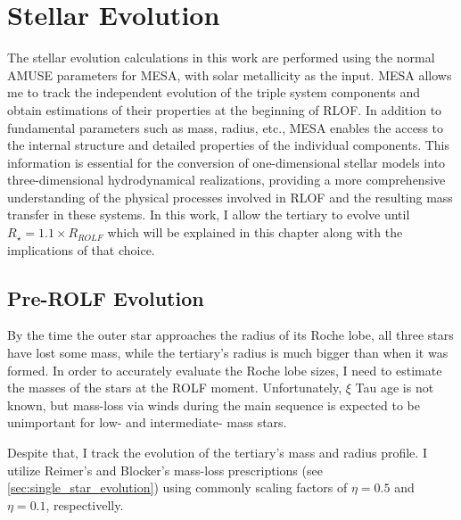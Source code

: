 \section{Stellar Evolution}\label{sec:stellar_evolution}

The stellar evolution calculations in this work are performed using the normal AMUSE parameters for MESA, with solar metallicity as the input.
MESA allows me to track the independent evolution of the triple system components and obtain estimations of their properties at the beginning of RLOF. In addition to fundamental parameters such as mass, radius, etc., MESA enables the access to the internal structure and detailed properties of the individual components. This information is essential for the conversion of one-dimensional stellar models into three-dimensional hydrodynamical realizations, providing a more comprehensive understanding of the physical processes involved in RLOF and the resulting mass transfer in these systems. In this work, I allow the tertiary to evolve until $R_{\star} = 1.1 \times R_{ROLF}$ which will be explained in this chapter along with the implications of that choice.

\subsection{Pre-ROLF Evolution}

By the time the outer star approaches the radius of its Roche lobe, all three stars have lost some mass, while the tertiary's radius is much bigger than when it was formed. In order to accurately evaluate the Roche lobe sizes,  I need to estimate the masses of the stars at the ROLF moment. Unfortunately, $\xi$ Tau age is not known, but mass-loss via winds during the main sequence is expected to be unimportant for low- and intermediate- mass stars.

Despite that, I track the evolution of the tertiary's mass and radius profile. I utilize Reimer's \cite{reimers1975circumstellar} and Blocker's \cite{bloecker1995stellarI,bloecker1995stellarII} mass-loss prescriptions (see \cref{sec:single_star_evolution}) using commonly scaling factors of $\eta = 0.5$ and $\eta = 0.1$, respectivelly.

